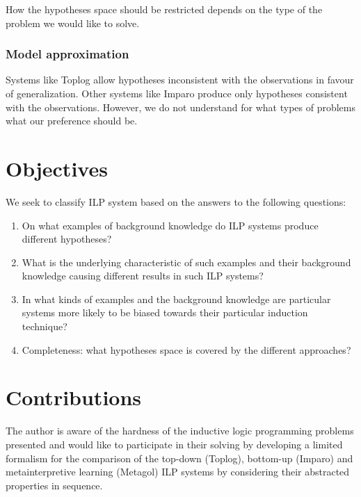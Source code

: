 How the hypotheses space should be restricted depends on the type of the problem we would like to solve.

\subsubsection{Model approximation}
Systems like Toplog allow hypotheses inconsistent with the observations in favour of generalization. Other systems like Imparo produce only hypotheses consistent with the observations. However, we do not understand for what types of problems what our preference should be.


\section{Objectives}
We seek to classify ILP system based on the answers to the following questions:
\begin{enumerate}
\item On what examples of background knowledge do ILP systems produce different hypotheses?
\item What is the underlying characteristic of such examples and their background knowledge causing different results in such ILP systems?
\item In what kinds of examples and the background knowledge are particular systems more likely to be biased towards their particular induction technique?
\item Completeness: what hypotheses space is covered by the different approaches?
\end{enumerate}

\section{Contributions}
The author is aware of the hardness of the inductive logic programming problems presented and would like to participate in their solving by developing a limited formalism for the comparison of the top-down (Toplog), bottom-up (Imparo) and metainterpretive learning (Metagol) ILP systems by considering their abstracted properties in sequence.
